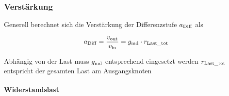 




\subsubsection{Verstärkung}

Generell berechnet sich die Verstärkung der Differenzstufe $a_{\rm Diff}$ als 

\[
    a_{\rm Diff} = \frac{v_{\rm out}}{v_{\rm in}} = g_{\rm md} \cdot r_{\rm Last\_tot}
\]

\begin{outline}
    \1 Abhängig von der Last muss $g_{\rm md}$ entsprechend eingesetzt werden
    \1 $r_{\rm Last\_tot}$ entspricht der gesamten Last am Ausgangsknoten
\end{outline}


\paragraph{Widerstandslast}

